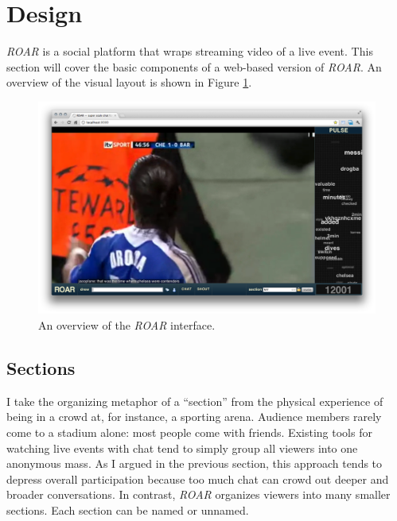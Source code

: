 



\section{Design}

\emph{ROAR} is a social platform that wraps streaming video of a live event. This section will cover the basic components of a web-based version of \emph{ROAR}. An overview of the visual layout is shown in Figure \ref{fig:roar_overview}. 

\begin{figure}
	\includegraphics{figures/roar/overview.png}
	\caption{An overview of the \emph{ROAR} interface.}
	\label{fig:roar_overview}
\end{figure}


\subsection{Sections}

I take the organizing metaphor of a ``section'' from the physical experience of being in a crowd at, for instance, a sporting arena. Audience members rarely come to a stadium alone: most people come with friends. Existing tools for watching live events with chat tend to simply group all viewers into one anonymous mass. As I argued in the previous section, this approach tends to depress overall participation because too much chat can crowd out deeper and broader conversations. In contrast, \emph{ROAR} organizes viewers into many  smaller sections. Each section can be named or unnamed. 


